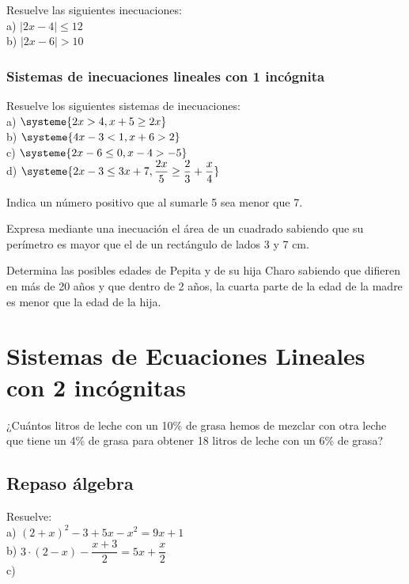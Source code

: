 \begin{ejer}
Resuelve las siguientes inecuaciones: \\
a) $|2x-4|\leq 12$ \\
b) $|2x-6|>10$
\end{ejer}

\subsubsection{Sistemas de inecuaciones lineales con 1 incógnita}

\begin{ejer}
Resuelve los siguientes sistemas de inecuaciones: \\
a) $\systeme{2x>4, x+5\geq 2x}$ \\
b) $\systeme{4x-3<1, x+6>2}$ \\
c) $\systeme{2x-6 \leq 0, x-4 > -5}$ \\
d) $\systeme{2x-3 \leq 3x+7, \dfrac{2x}{5} \geq \dfrac{2}{3}+\dfrac{x}{4}}$
\end{ejer}

\begin{ejer}
Indica un número positivo que al sumarle 5 sea menor que 7.
\end{ejer}

\begin{ejer}
Expresa mediante una inecuación el área de un cuadrado sabiendo que su perímetro es mayor que el de un rectángulo de lados 3 y 7 cm.
\end{ejer}

\begin{ejer}
Determina las posibles edades de Pepita y de su hija Charo sabiendo que difieren en más de 20 años y que dentro de 2 años, la cuarta parte de la edad de la madre es menor que la edad de la hija.
\end{ejer}

\section{Sistemas de Ecuaciones Lineales con 2 incógnitas}

\begin{ejer}
¿Cuántos litros de leche con un 10\% de grasa hemos de mezclar con otra leche que tiene un 4\% de grasa para obtener 18 litros de leche con un 6\% de grasa?
\end{ejer}

\subsection{Repaso álgebra}

\begin{ejer}
Resuelve: \\
a) $(2+x)^2-3+5x-x^2=9x+1$ \\
b) $3\cdot (2-x)-\dfrac{x+3}{2}=5x+\dfrac{x}{2}$ \\
c) 
\end{ejer}

